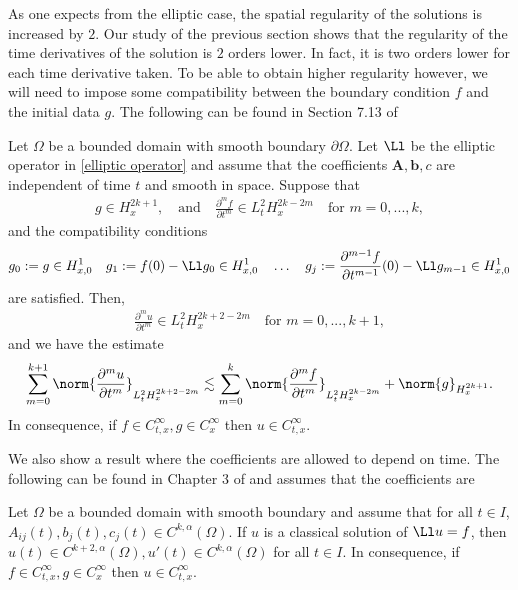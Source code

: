\documentclass[
    a4paper,
    DIV=14,
    abstract=true,
    numbers=noenddot
]{scrartcl}
\begin{document}
As one expects from the elliptic case, the spatial regularity of the solutions is increased by $2$. Our study of the previous section shows that the regularity of the time derivatives of the solution is $2$ orders lower. In fact, it is two orders lower for each time derivative taken. To be able to obtain higher regularity however, we will need to impose some compatibility between the boundary condition $f$ and the initial data $g$. The following can be found in Section 7.13 of \cite{evans2022partial}
\begin{theorem}
Let $\Omega $ be a bounded domain with smooth boundary $\partial \Omega$. Let $\Ll $ be the elliptic operator in \eqref{elliptic operator} and assume that the coefficients $\bm{A,b},c$ are independent of time $t$ and smooth in space. Suppose that
  \begin{align*}
 g \in H^{2 k+1}_x,\quad \text{and} \quad  \frac{\partial ^m f}{\partial t^m} \in L^2_tH_x^{2 k-2 m} \quad \text{for } m=0,...,k,
  \end{align*}
 and the compatibility conditions   
  \begin{align*}
 g_0:=g \in H_{x,0}^1 \quad g_1:=f(0)-\Ll g_0 \in H_{x,0}^1 \quad \ldots\quad g_j:=\frac{\partial ^{m-1} f}{\partial t^{m-1}}(0)-\Ll g_{m-1} \in H_{x,0}^1
  \end{align*}
 are satisfied. Then,
  \begin{align*}
  \frac{\partial ^m u}{\partial t^m} \in L^2_tH_x^{2 k+2-2 m} \quad \text{for } m=0,...,k+1,
  \end{align*}
 and we have the estimate
  \begin{align*}
  \sum_{m=0}^{k+1} \norm{\frac{\partial^m u}{\partial t^m}}_{L^2_tH_x^{2 k+2-2 m}}\lesssim \sum_{m=0}^k \norm{\frac{\partial ^m f}{\partial t^m}}_{L^2_tH_x^{2 k-2 m}}+\norm{g}_{H_x^{2 k+1}}.
  \end{align*}
 In consequence, if $f \in C^\infty_{t,x}, g \in C^\infty_x$ then $u \in C^\infty_{t,x}$. 
\end{theorem}
We also show a result where the coefficients are allowed to depend on time. The following can be found in Chapter $3$ of \cite{Friedman1983PartialDE} and assumes that the coefficients are 

\begin{theorem}
 Let $\Omega $ be a bounded domain with smooth boundary and assume that for all $t \in I$,
  $A_{ij}(t),b_j(t), c_j(t) \in C^{k, \alpha}(\Omega )$. If $u$ is a classical solution of $\Ll u=f$, then $u(t) \in C^{k+2,\alpha}(\Omega ), u'(t) \in C^{k, \alpha}(\Omega )$ for all $t \in I$. In consequence, if $f \in C^\infty_{t,x}, g \in C^\infty_x$ then $u \in C^\infty_{t,x}$. 
\end{theorem}
\end{document}
